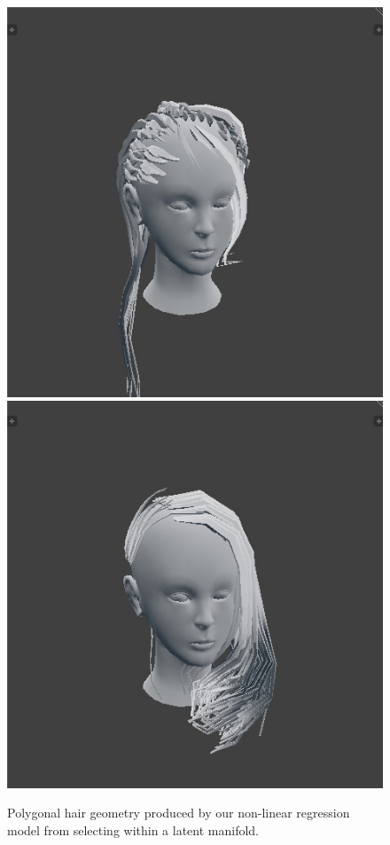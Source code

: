 \documentclass[ %
author={Dillon Keith Diep},
supervisor={Dr. Carl Henrik Ek},
degree={MEng},
title={ART-CG Hair:},
subtitle={Assisted Real-time Content Generation of Stylised Virtual Hair},
type={Research},
year={2017} ]{dissertation}
\begin{document}
\begin{figure}[!h]
	\centering
	\caption{Polygonal hair geometry produced by our non-linear regression model from selecting within a latent manifold.}
	\includegraphics[scale=0.25]{images/outputMesh1}
	\includegraphics[scale=0.25]{images/outputMesh2}

\end{figure}
\end{document}
